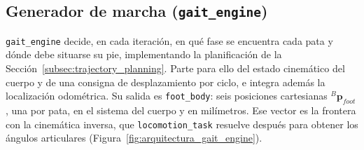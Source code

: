 \newpage
\subsection{Generador de marcha (\texttt{gait\_engine})}
\label{subsec:gait_engine}

\texttt{gait\_engine} decide, en cada iteración, en qué fase se encuentra cada
pata y dónde debe situarse su pie, implementando la planificación de la
Sección~\ref{subsec:trajectory_planning}. Parte para ello del estado cinemático
del cuerpo y de una consigna de desplazamiento por ciclo, e integra además la
localización odométrica. Su salida es \texttt{foot\_body}: seis posiciones
cartesianas ${}^{B}\bm{p}_{foot}$, una por pata, en el sistema del cuerpo y en
milímetros. Ese vector es la frontera con la cinemática inversa, que
\texttt{locomotion\_task} resuelve después para obtener los ángulos articulares
(Figura~\ref{fig:arquitectura_gait_engine}).

